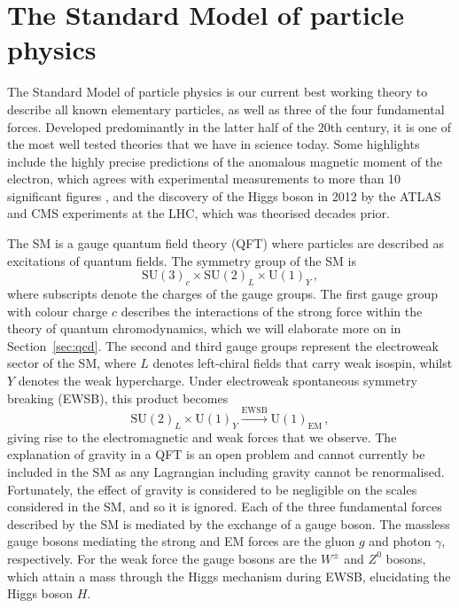 \documentclass[main.tex]{subfiles}
\begin{document}
\section{The Standard Model of particle physics}
    The Standard Model of particle physics is our current
    best working theory to describe all known elementary particles,
    as well as three of the four fundamental forces. Developed
    predominantly in the latter half of the 20th century, it is
    one of the most well tested theories that we have in science today.
    Some highlights include the highly precise predictions of the
    anomalous magnetic moment of the electron, which agrees with experimental
    measurements to more than 10 significant figures \cite{Aoyama:2017uqe},
    and the discovery of the Higgs boson in 2012 by the ATLAS \cite{ATLAS:2012yve}
    and CMS experiments \cite{CMS:2012qbp} at the LHC,
    which was theorised decades prior.

    The SM is a gauge quantum field theory (QFT) where particles
    are described as excitations of quantum fields. The symmetry group
    of the SM is
    \begin{equation}\label{eqn:SM_gauge}
        \mathrm{SU}(3)_{c} \times \mathrm{SU}(2)_{L} \times \mathrm{U}(1)_{Y}\, ,
    \end{equation}
    where subscripts denote the charges of the gauge groups. The first gauge
    group with colour charge $c$ describes the interactions of the
    strong force within the theory of quantum chromodynamics, which we
    will elaborate more on in Section~\ref{sec:qcd}. The second
    and third gauge groups represent the electroweak sector of the SM, where
    $L$ denotes left-chiral fields that carry weak isospin, whilst $Y$ denotes
    the weak hypercharge. Under electroweak
    spontaneous symmetry breaking (EWSB), this product becomes
    \begin{equation}\label{eqn:SM_SSB}
        \mathrm{SU}(2)_{L} \times \mathrm{U}(1)_{Y} \xrightarrow{\mathrm{EWSB}} \mathrm{U}(1)_{\mathrm{EM}} \, ,
    \end{equation}
    giving rise to the electromagnetic and weak forces that we observe.
    The explanation of gravity in a QFT is an open problem and cannot currently
    be included in the SM as any Lagrangian including gravity cannot be renormalised.
    Fortunately, the effect of gravity is considered
    to be negligible on the scales considered in the SM, and so it is ignored.
    Each of the three fundamental forces described by the SM is mediated
    by the exchange of a gauge boson. The massless gauge bosons mediating the strong
    and EM forces are the gluon $g$ and photon $\gamma$,
    respectively. For the weak force the gauge bosons are the $W^{\pm}$
    and $Z^{0}$ bosons, which attain a mass through the Higgs mechanism \cite{Englert:1964et,Higgs:1964pj,Guralnik:1964eu}
    during EWSB, elucidating the Higgs boson $H$.
\end{document}
